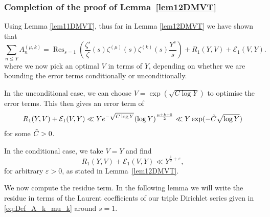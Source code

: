 \documentclass[12pt, a4paper,reqno]{amsart}
\DeclareMathOperator*{\res}{Res}
\theoremstyle{definition}
\numberwithin{equation}{section}
\begin{document}
\subsubsection*{Completion of the proof of Lemma~\ref{lem12DMVT}}\hfill

Using Lemma \ref{lem11DMVT}, thus far in Lemma \ref{lem12DMVT} we have shown that 
\begin{equation*}
    \sum_{n\le Y}A_n^{(\mu,k)}=\res_{s=1}\left(\frac{\zeta'}{\zeta}(s)\zeta^{(\mu)}(s)\zeta^{(k)}(s)\frac{Y^s}{s}\right)+R_1(Y,V)+\mathcal{E}_1(V,Y).
\end{equation*}
where we now pick an optimal $V$ in terms of $Y$, depending on whether we are bounding the error terms conditionally or unconditionally.

In the unconditional case, we can choose $V=\exp(\sqrt{C\log Y})$ to optimise the error terms. This then gives an error term of 
\begin{equation*}
 R_1(Y,V)+\mathcal{E}_1(V,Y)   \ll Ye^{-\sqrt{C\log Y}}(\log Y)^{\frac{\mu+k+5}{2}}\ll Y\exp(-\Tilde{C}\sqrt{\log Y})
\end{equation*}
for some $\Tilde{C}>0$.

In the conditional case, we take $V=Y$ and find 
\[
R_1(Y,V)+\mathcal{E}_1(V,Y) \ll Y^{\frac{1}{2} + \varepsilon},
\]
for arbitrary $\varepsilon>0$, as stated in Lemma~\ref{lem12DMVT}.

We now compute the residue term. In the following lemma we will write the residue in terms of the Laurent coefficients of our triple Dirichlet series given in \eqref{eq:Def_A_k_mu_k} around $s=1$.
\end{document}
